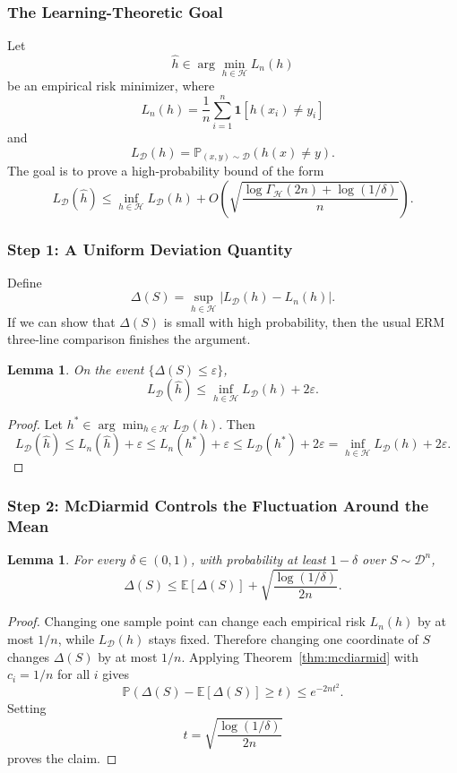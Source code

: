 \documentclass{article}
\newtheorem{lemma}[theorem]{Lemma}
\theoremstyle{definition}
\theoremstyle{remark}
\newcommand{\EE}{\mathbb{E}}
\newcommand{\PP}{\mathbb{P}}
\newcommand{\cH}{\mathcal{H}}
\newcommand{\cD}{\mathcal{D}}
\newcommand{\ind}{\mathbf{1}}
\begin{document}
\subsubsection{The Learning-Theoretic Goal}

Let
$$
\widehat{h} \in \arg\min_{h\in\cH} L_n(h)
$$
be an empirical risk minimizer, where
$$
L_n(h) = \frac{1}{n}\sum_{i=1}^n \ind[h(x_i)\ne y_i]
$$
and
$$
L_{\cD}(h) = \PP_{(x,y)\sim \cD}(h(x)\ne y).
$$
The goal is to prove a high-probability bound of the form
$$
L_{\cD}(\widehat{h})
\le
\inf_{h\in\cH} L_{\cD}(h)
+ O\!\left(
\sqrt{\frac{\log \Gamma_{\cH}(2n) + \log(1/\delta)}{n}}
\right).
$$

\subsubsection{Step 1: A Uniform Deviation Quantity}

Define
$$
\Delta(S) = \sup_{h\in\cH} |L_{\cD}(h)-L_n(h)|.
$$
If we can show that $\Delta(S)$ is small with high probability, then the usual ERM three-line comparison finishes the argument.

\begin{lemma}
\label{lem:erm-three-line}
On the event $\{\Delta(S)\le \varepsilon\}$,
$$
L_{\cD}(\widehat{h})
\le
\inf_{h\in\cH} L_{\cD}(h) + 2\varepsilon.
$$
\end{lemma}

\begin{proof}
Let $h^* \in \arg\min_{h\in\cH} L_{\cD}(h)$. Then
$$
L_{\cD}(\widehat{h})
\le
L_n(\widehat{h}) + \varepsilon
\le
L_n(h^*) + \varepsilon
\le
L_{\cD}(h^*) + 2\varepsilon
=
\inf_{h\in\cH} L_{\cD}(h) + 2\varepsilon.
$$
\end{proof}

\subsubsection{Step 2: McDiarmid Controls the Fluctuation Around the Mean}

\begin{lemma}
\label{lem:mcdiarmid-for-delta}
For every $\delta \in (0,1)$, with probability at least $1-\delta$ over $S\sim \cD^n$,
$$
\Delta(S)
\le
\EE[\Delta(S)] + \sqrt{\frac{\log(1/\delta)}{2n}}.
$$
\end{lemma}

\begin{proof}
Changing one sample point can change each empirical risk $L_n(h)$ by at most $1/n$, while $L_{\cD}(h)$ stays fixed. Therefore changing one coordinate of $S$ changes $\Delta(S)$ by at most $1/n$. Applying Theorem~\ref{thm:mcdiarmid} with $c_i=1/n$ for all $i$ gives
$$
\PP\!\left(
\Delta(S)-\EE[\Delta(S)] \ge t
\right)
\le
e^{-2nt^2}.
$$
Setting
$$
t = \sqrt{\frac{\log(1/\delta)}{2n}}
$$
proves the claim.
\end{proof}
\end{document}
